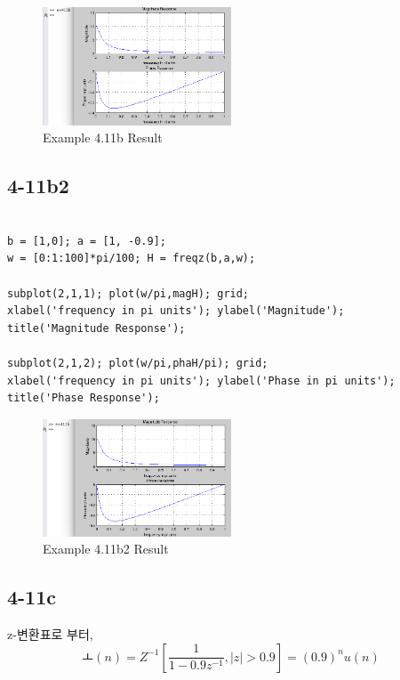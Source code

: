 \documentclass[11pt
  , a4paper
  , article
  , oneside
]{memoir}
\begin{document}
\begin{figure}[h!]
	\centering
	\includegraphics[width=0.5\textwidth,height=0.3\textwidth]{./images/ex411b.png}
	\caption{Example 4.11b Result}
	\label{fig:Example 4.11b Result}
\end{figure}

\subsection{4-11b2}
\begin{lstlisting}[style=termstyle]
%Example 4.11-b

b = [1,0]; a = [1, -0.9];
w = [0:1:100]*pi/100; H = freqz(b,a,w);

subplot(2,1,1); plot(w/pi,magH); grid;
xlabel('frequency in pi units'); ylabel('Magnitude');
title('Magnitude Response');

subplot(2,1,2); plot(w/pi,phaH/pi); grid;
xlabel('frequency in pi units'); ylabel('Phase in pi units');
title('Phase Response');
\end{lstlisting}

\begin{figure}[h!]
	\centering
	\includegraphics[width=0.5\textwidth,height=0.3\textwidth]{./images/ex411-b2.png}
	\caption{Example 4.11b2 Result}
	\label{fig:Example 4.11b2 Result}
	\end{figure}

\subsection{4-11c}
z-변환표로 부터,
\begin {equation}
ㅗ(n) = Z^{-1}[\frac{1}{1-0.9z^{-1}}, |z|> 0.9] = (0.9)^nu(n)
\end {equation}
\end{document}
